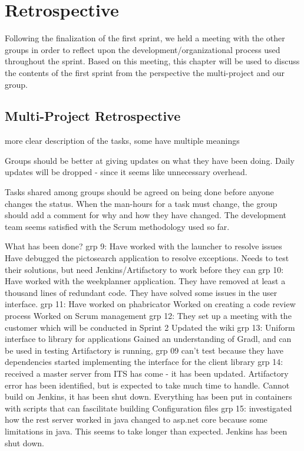 \section{Retrospective}
Following the finalization of the first sprint, we held a meeting with the other
groups in order to reflect upon the development/organizational process used
throughout the sprint. Based on this meeting, this chapter will be used to
discuss the contents of the first sprint from the perspective the multi-project and our
group.

\subsection{Multi-Project Retrospective}



more clear description of the tasks, some have multiple meanings

Groups should be better at giving updates on what they have been doing.
Daily updates will be dropped - since it seems like unnecessary overhead.

Tasks shared among groups should be agreed on being done before anyone changes the status.
When the man-hours for a task must change, the group should add a comment for why and how they have changed.
The development team seems satisfied with the Scrum methodology used so far.

What has been done?
grp 9:
Have worked with the launcher to resolve issues
Have debugged the pictosearch application to resolve exceptions.
Needs to test their solutions, but need Jenkins/Artifactory to work before they can
grp 10:
Have worked with the weekplanner application.
They have removed at least a thousand lines of redundant code.
They have solved some issues in the user interface.
grp 11:
Have worked on phabricator
Worked on creating a code review process
Worked on Scrum management
grp 12:
They set up a meeting with the customer which will be conducted in Sprint 2
Updated the wiki
grp 13:
Uniform interface to library for applications
Gained an understanding of Gradl, and can be used in testing
Artifactory is running, grp 09 can’t test because they have dependencies
started implementing the interface for the client library
grp 14:
received a master server from ITS has come - it has been updated.
Artifactory error has been identified, but is expected to take much time to handle.
Cannot build on Jenkins, it has been shut down.
Everything has been put in containers with scripts that can fascilitate building
Configuration files
grp 15:
investigated how the rest server worked in java
changed to asp.net core because some limitations in java. This seems to take longer than expected.
Jenkins has been shut down.

